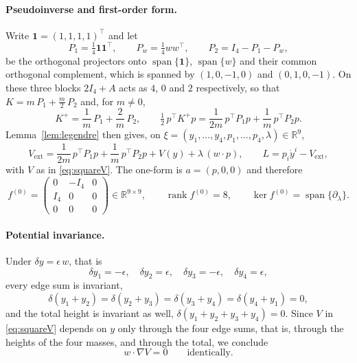 \documentclass[12pt]{article}
\theoremstyle{plain}
\theoremstyle{definition}
\theoremstyle{remark}
\newcommand{\R}{\mathbb{R}}
\DeclareMathOperator{\rank}{rank}
\DeclareMathOperator{\spn}{span}
\begin{document}
	\paragraph{Pseudoinverse and first-order form.} Write
	$\mathbf{1}=(1,1,1,1)^{\top}$ and let
	\[
	P_{1}=\tfrac14\mathbf{1}\mathbf{1}^{\top},
	\qquad
	P_{w}=\tfrac14 ww^{\top},
	\qquad
	P_{2}=I_{4}-P_{1}-P_{w},
	\]
	be the orthogonal projectors onto $\spn\{\mathbf{1}\}$, $\spn\{w\}$ and their
	common orthogonal complement, which is spanned by $(1,0,-1,0)$ and
	$(0,1,0,-1)$. On these three blocks $2I_{4}+A$ acts as $4$, $0$ and $2$
	respectively, so that $K=m\,P_{1}+\tfrac m2\,P_{2}$ and, for $m\neq0$,
	\begin{equation}
		K^{+}=\frac1m\,P_{1}+\frac2m\,P_{2},
		\qquad
		\tfrac12\,p^{\top}K^{+}p
		=\frac{1}{2m}\,p^{\top}P_{1}p+\frac1m\,p^{\top}P_{2}p .
		\label{eq:squareKplus}
	\end{equation}
	Lemma~\ref{lem:legendre} then gives, on
	$\xi=(y_{1},\dots,y_{4},p_{1},\dots,p_{4},\lambda)\in\R^{9}$,
	\begin{equation}
		V_{\mathrm{ext}}=\frac{1}{2m}\,p^{\top}P_{1}p+\frac1m\,p^{\top}P_{2}p
		+V(y)+\lambda\,(w\!\cdot\!p),
		\qquad
		L=p_{i}\dot y^{i}-V_{\mathrm{ext}},
		\label{eq:squareLFJ}
	\end{equation}
	with $V$ as in \eqref{eq:squareV}. The one-form is $a=(p,0,0)$ and therefore
	\begin{equation}
		f^{(0)}=\begin{pmatrix}0&-I_{4}&0\\ I_{4}&0&0\\ 0&0&0\end{pmatrix}
		\in\R^{9\times9},
		\qquad
		\rank f^{(0)}=8,
		\qquad
		\ker f^{(0)}=\spn\{\partial_{\lambda}\} .
		\label{eq:squaref0}
	\end{equation}
	
	\paragraph{Potential invariance.} Under $\delta y=\epsilon\,w$, that is
	\begin{equation}
		\delta y_{1}=-\epsilon,\quad
		\delta y_{2}=\epsilon,\quad
		\delta y_{3}=-\epsilon,\quad
		\delta y_{4}=\epsilon,
		\label{eq:squaredelta}
	\end{equation}
	every edge sum is invariant,
	\begin{equation}
		\delta(y_{1}+y_{2})=\delta(y_{2}+y_{3})=\delta(y_{3}+y_{4})
		=\delta(y_{4}+y_{1})=0,
		\label{eq:squareedges}
	\end{equation}
	and the total height is invariant as well,
	$\delta(y_{1}+y_{2}+y_{3}+y_{4})=0$. Since $V$ in \eqref{eq:squareV} depends on
	$y$ only through the four edge sums, that is, through the heights of the four
	masses, and through the total, we conclude
	\begin{equation}
		w\!\cdot\!\nabla V=0 \qquad\text{identically.}
		\label{eq:squareinv}
	\end{equation}
	
\end{document}

